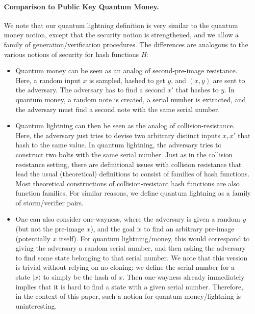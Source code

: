 \paragraph{Comparison to Public Key Quantum Money.} We note that our quantum lightning definition is very similar to the quantum money notion, except that the security notion is strengthened, and we allow a family of generation/verification procedures.  The differences are analogous to the various notions of security for hash functions $H$:
\begin{itemize}
	\item Quantum money can be seen as an analog of second-pre-image resistance.  Here, a random input $x$ is sampled, hashed to get $y$, and $(x,y)$ are sent to the adversary.  The adversary has to find a second $x'$ that hashes to $y$.  In quantum money, a random note is created, a serial number is extracted, and the adversary must find a second note with the same serial number.
	\item Quantum lightning can then be seen as the analog of collision-resistance.  Here, the adversary just tries to devise two arbitrary distinct  inputs $x,x'$ that hash to the same value.  In quantum lightning, the adversary tries to construct two bolts with the same serial number.  Just as in the collision resistance setting, there are definitional issues with collision resistance that lead the usual (theoretical) definitions to consist of families of hash functions.  Most theoretical constructions of collision-resistant hash functions are also function families.  For similar reasons, we define quantum lightning as a family of storm/verifier pairs.
	\item One can also consider one-wayness, where the adversary is given a random $y$ (but not the pre-image $x$), and the goal is to find an arbitrary pre-image (potentially $x$ itself).  For quantum lightning/money, this would correspond to giving the adversary a random serial number, and then asking the adversary to find some state belonging to that serial number.  We note that this version is trivial without relying on no-cloning: we define the serial number for a state $|x\rangle$ to simply be the hash of $x$.  Then one-wayness already immediately implies that it is hard to find a state with a given serial number.  Therefore, in the context of this paper, such a notion for quantum money/lightning is uninteresting.
\end{itemize}


